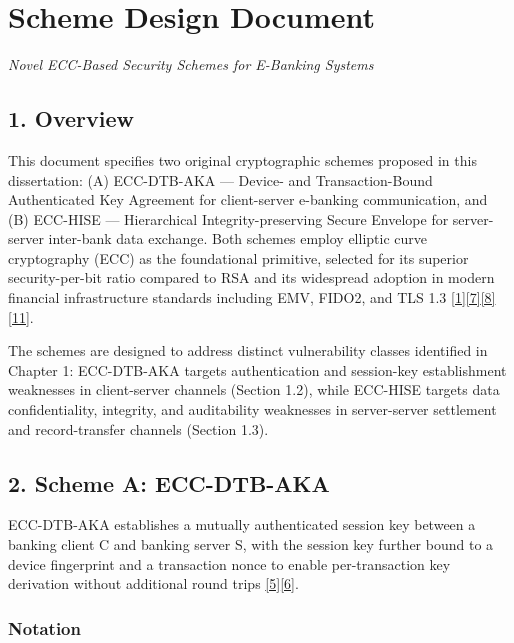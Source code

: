 \chapter{Scheme Design Document}
\label{ch:scheme-design}

\noindent\textit{Novel ECC-Based Security Schemes for E-Banking Systems}\par\vspace{1em}

\section{1. Overview}

\indent This document specifies two original cryptographic schemes proposed in this dissertation: (A) ECC-DTB-AKA --- Device- and Transaction-Bound Authenticated Key Agreement for client-server e-banking communication, and (B) ECC-HISE --- Hierarchical Integrity-preserving Secure Envelope for server-server inter-bank data exchange. Both schemes employ elliptic curve cryptography (ECC) as the foundational primitive, selected for its superior security-per-bit ratio compared to RSA and its widespread adoption in modern financial infrastructure standards including EMV, FIDO2, and TLS 1.3 \hyperref[ref:1]{[1]}\hyperref[ref:7]{[7]}\hyperref[ref:8]{[8]}\hyperref[ref:11]{[11]}.

\indent The schemes are designed to address distinct vulnerability classes identified in Chapter 1: ECC-DTB-AKA targets authentication and session-key establishment weaknesses in client-server channels (Section 1.2), while ECC-HISE targets data confidentiality, integrity, and auditability weaknesses in server-server settlement and record-transfer channels (Section 1.3).

\section{2. Scheme A: ECC-DTB-AKA}

\indent ECC-DTB-AKA establishes a mutually authenticated session key between a banking client C and banking server S, with the session key further bound to a device fingerprint and a transaction nonce to enable per-transaction key derivation without additional round trips \hyperref[ref:5]{[5]}\hyperref[ref:6]{[6]}.

\subsection{Notation}

